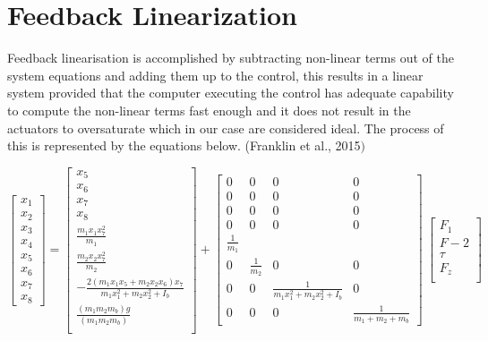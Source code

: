 \documentclass{UoNMCHA}
\numberwithin{equation}{section}
\begin{document}
\section{Feedback Linearization}

Feedback linearisation is accomplished by subtracting non-linear terms out of the system equations and
adding them up to the control, this results in a linear system provided that the computer executing the
control has adequate capability to compute the non-linear terms fast enough and it does not result in the
actuators to oversaturate which in our case are considered ideal. The process of this is represented by
the equations below. (Franklin et al., 2015$)$

\begin{equation}
\begin{bmatrix}
x_{1} \\
x_{2} \\
x_{3} \\
x_{4} \\
x_{5} \\
x_{6} \\
x_{7} \\
x_{8}
\end{bmatrix} = 
\begin{bmatrix}
x_{5} \\
x_{6} \\
x_{7} \\
x_{8} \\
\frac{m_1 x_1 x_7^2}{m_1} \\
\frac{m_2 x_2 x_7^2}{m_2} \\
-\frac{2(m_1 x_1 x_5 + m_2 x_2 x_6)x_7}{m_1 x_1^2 + m_2x_2^2 + I_b} \\
\frac{(m_1 m_2 m_b)g}{(m_1 m_2 m_b)} \\
\end{bmatrix} +
\begin{bmatrix}
0 & 0 & 0 & 0 \\
0 & 0 & 0 & 0 \\
0 & 0 & 0 & 0 \\
0 & 0 & 0 & 0 \\
\frac{1}{m_{1}} & & & \\
0 & \frac{1}{m_{2}} & 0 & 0 \\
0 & 0 & \frac{1}{m_1 x_1^2 + m_2 x_2^2 + I_b} & 0 \\
0 & 0 & 0 & \frac{1}{m_1  + m_2  + m_b}
\end{bmatrix}\ 
\begin{bmatrix}
F_1 \\
F-2 \\
\tau \\
F_z \\
\end{bmatrix}
\end{equation}
\end{document}
